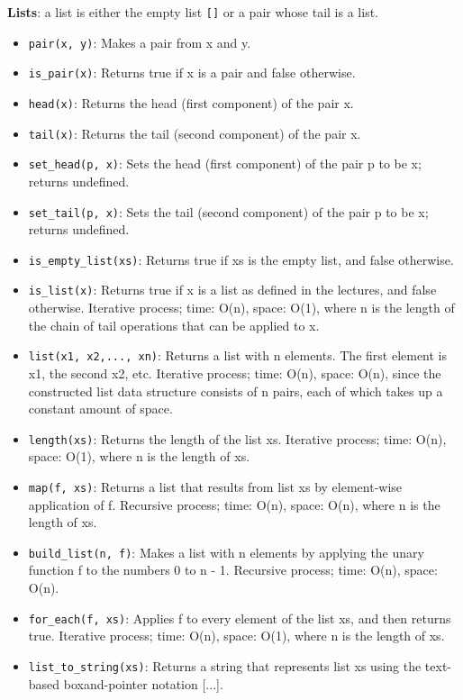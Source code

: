 \documentclass[a4paper]{article} \usepackage[backend=biber, style=numeric, sorting=none]{biblatex}
\begin{document}
\begin{multicols*}{4}
{\small\textbf{Lists}}: a list is either the empty list \texttt{[]} or a pair whose tail is a list.
\begin{itemize}
\itemsep -0.5em
\item \texttt{pair(x, y)}: Makes a pair from x and y.
\item \texttt{is\_pair(x)}: Returns true if x is a pair and false otherwise.
\item \texttt{head(x)}: Returns the head (first component) of the pair x.
\item \texttt{tail(x)}: Returns the tail (second component) of the pair x.
\item \texttt{set\_head(p, x)}: Sets the head (first component) of the pair p to be x; returns undefined.
\item \texttt{set\_tail(p, x)}: Sets the tail (second component) of the pair p to be x; returns undefined.
\item \texttt{is\_empty\_list(xs)}: Returns true if xs is the empty list, and false otherwise.
\item \texttt{is\_list(x)}: Returns true if x is a list as defined in the lectures, and false otherwise. Iterative process; time: O(n), space: O(1), where n is the length of the chain of tail operations that can be applied to x.
\item \texttt{list(x1, x2,..., xn)}: Returns a list with n elements. The first element is x1, the second x2, etc. Iterative process; time: O(n), space: O(n), since the constructed list data structure consists of n pairs, each of which takes up a constant amount of space.
\item \texttt{length(xs)}: Returns the length of the list xs. Iterative process; time: O(n), space: O(1), where n is the length of xs.
\item \texttt{map(f, xs)}: Returns a list that results from list xs by element-wise application of f. Recursive process; time: O(n), space: O(n), where n is the length of xs.
\item \texttt{build\_list(n, f)}: Makes a list with n elements by applying the unary function f to the numbers 0 to n - 1. Recursive process; time: O(n), space: O(n).
\item \texttt{for\_each(f, xs)}: Applies f to every element of the list xs, and then returns true. Iterative process; time: O(n), space: O(1), where n is the length of xs.
\item \texttt{list\_to\_string(xs)}: Returns a string that represents list xs using the text-based boxand-pointer notation [...].

\end{itemize}
\end{multicols*}
\end{document}
